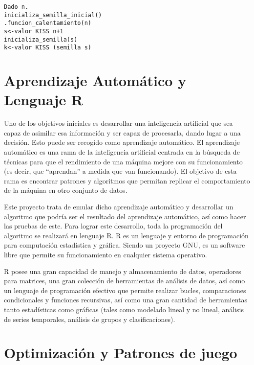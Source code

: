 \begin{verbatim}
Dado n.
inicializa_semilla_inicial()
.funcion_calentamiento(n)
s<-valor KISS n+1
inicializa_semilla(s)
k<-valor KISS (semilla s)
\end{verbatim}
\section{Aprendizaje Automático y Lenguaje R}

Uno de los objetivos iniciales es desarrollar una inteligencia artificial que sea capaz de asimilar esa información y ser capaz de procesarla, dando lugar a una decisión. Esto puede ser recogido como aprendizaje automático. El aprendizaje automático es una rama de la inteligencia artificial centrada en la búsqueda de técnicas para que el rendimiento de una máquina mejore con su funcionamiento (es decir, que “aprendan” a medida que van funcionando). El objetivo de esta rama es encontrar patrones y algoritmos que permitan replicar el comportamiento de la máquina en otro conjunto de datos.

 Este proyecto trata de emular dicho aprendizaje automático y desarrollar un algoritmo que podría ser el resultado del aprendizaje automático, así como hacer las pruebas de este. Para lograr este desarrollo, toda la programación del algoritmo se realizará en lenguaje R.
R es un lenguaje y entorno de programación para computación estadística y gráfica. Siendo un proyecto GNU, es un software libre que permite su funcionamiento en cualquier sistema operativo. 

R posee una gran capacidad de manejo y almacenamiento de datos, operadores para matrices, una gran colección de herramientas de análisis de datos, así como un lenguaje de programación efectivo que permite realizar bucles, comparaciones condicionales y funciones recursivas, así como una gran cantidad de herramientas tanto estadísticas como gráficas (tales como modelado lineal y no lineal, análisis de series temporales, análisis de grupos y clasificaciones).\cite{r-project}

\section{Optimización y Patrones de juego}
\label{sec:opti}

